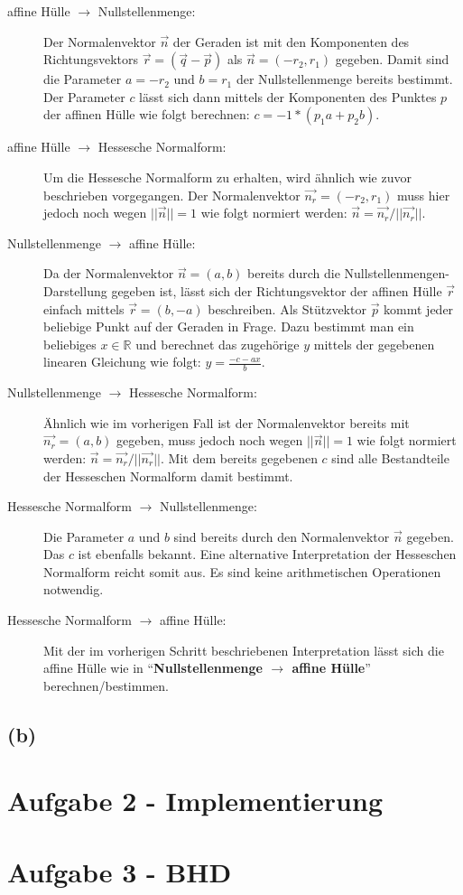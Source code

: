 \documentclass[a4paper]{article}
\begin{document}
\begin{description}
 \item[affine Hülle $\rightarrow$ Nullstellenmenge:] 
 Der Normalenvektor $\vec{n}$ der Geraden ist mit den Komponenten des Richtungsvektors $\vec{r} = (\vec{q} - \vec{p})$
 als $\vec{n} = (-r_2, r_1)$ gegeben. Damit sind die Parameter $a = -r_2$ und $b = r_1$  der Nullstellenmenge bereits bestimmt.
 Der Parameter $c$ lässt sich dann mittels der Komponenten des Punktes $p$ der affinen Hülle wie folgt berechnen: $c = -1 * (p_1a + p_2b)$.
 
 \item[affine Hülle $\rightarrow$ Hessesche Normalform:] Um die Hessesche Normalform zu erhalten, wird ähnlich
 wie zuvor beschrieben vorgegangen. Der Normalenvektor $\vec{n_r} = (-r_2, r_1)$ muss hier jedoch noch wegen $||\vec{n}|| = 1$ wie folgt 
 normiert werden: $\vec{n} = \vec{n_r}/||\vec{n_r}||$.
 
 \item[Nullstellenmenge $\rightarrow$ affine Hülle:]
 Da der Normalenvektor $\vec{n} = (a,b)$ bereits durch die Nullstellenmengen-Darstellung gegeben ist, lässt sich der Richtungsvektor
 der affinen Hülle $\vec{r}$
 einfach mittels $\vec{r} = (b,-a)$ beschreiben. Als Stützvektor $\vec{p}$ kommt jeder beliebige Punkt auf der Geraden in Frage. Dazu bestimmt man ein
 beliebiges $x \in \mathbb{R}$ und berechnet das zugehörige $y$ mittels der gegebenen linearen Gleichung wie folgt: $y = \frac{-c -ax}{b}$.
 
 \item[Nullstellenmenge $\rightarrow$ Hessesche Normalform:]
 Ähnlich wie im vorherigen Fall ist der Normalenvektor bereits mit $\vec{n_r} = (a,b)$ gegeben, muss jedoch noch wegen $||\vec{n}|| = 1$ wie folgt 
 normiert werden: $\vec{n} = \vec{n_r}/||\vec{n_r}||$. Mit dem bereits gegebenen $c$ sind alle Bestandteile der Hesseschen Normalform damit bestimmt. 
 
 \item[Hessesche Normalform $\rightarrow$ Nullstellenmenge:]
 Die Parameter $a$ und $b$ sind bereits durch den Normalenvektor $\vec{n}$ gegeben. Das $c$ ist ebenfalls bekannt. 
 Eine alternative Interpretation der Hesseschen Normalform reicht somit aus. Es sind keine arithmetischen Operationen notwendig. 
 
 \item[Hessesche Normalform $\rightarrow$ affine Hülle:]
 Mit der im vorherigen Schritt beschriebenen Interpretation lässt sich die affine Hülle wie in "`\textbf{Nullstellenmenge $\rightarrow$ affine Hülle}"'
 berechnen/bestimmen. 
 
\end{description}



\subsection*{(b)}


\section*{Aufgabe 2 - Implementierung}

\section*{Aufgabe 3 - BHD}
\end{document}
